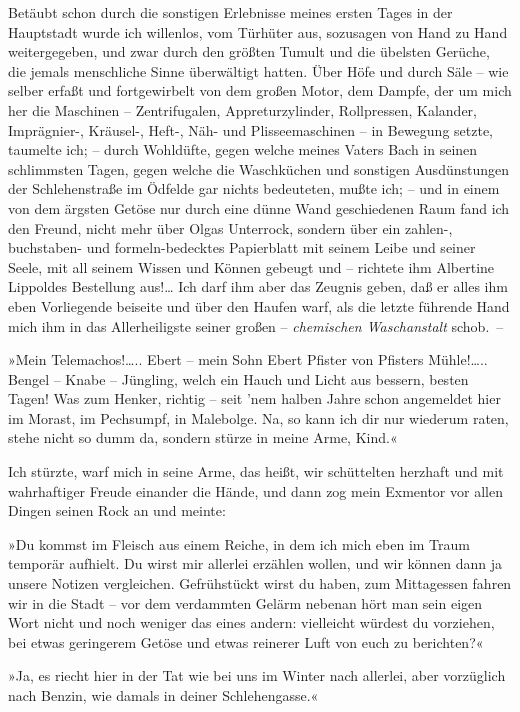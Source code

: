 Betäubt schon durch die sonstigen Erlebnisse meines ersten Tages in
der Hauptstadt wurde ich willenlos, vom Türhüter aus, sozusagen von
Hand zu Hand weitergegeben, und zwar durch den größten Tumult und
die übelsten Gerüche, die jemals menschliche Sinne überwältigt
hatten. Über Höfe und durch Säle – wie selber erfaßt und
fortgewirbelt von dem großen Motor, dem Dampfe, der um mich her die
Maschinen – Zentrifugalen, Appreturzylinder, Rollpressen, Kalander,
Imprägnier-, Kräusel-, Heft-, Näh- und Plisseemaschinen – in
Bewegung setzte, taumelte ich; – durch Wohldüfte, gegen welche
meines Vaters Bach in seinen schlimmsten Tagen, gegen welche die
Waschküchen und sonstigen Ausdünstungen der Schlehenstraße im
Ödfelde gar nichts bedeuteten, mußte ich; – und in einem von dem
ärgsten Getöse nur durch eine dünne Wand geschiedenen Raum fand ich
den Freund, nicht mehr über Olgas Unterrock, sondern über ein
zahlen-, buchstaben- und formeln-bedecktes Papierblatt mit seinem
Leibe und seiner Seele, mit all seinem Wissen und Können gebeugt
und – richtete ihm Albertine Lippoldes Bestellung aus!\ldots{} Ich darf
ihm aber das Zeugnis geben, daß er alles ihm eben Vorliegende
beiseite und über den Haufen warf, als die letzte führende Hand
mich ihm in das Allerheiligste seiner großen –
\emph{chemischen Waschanstalt} schob.~–

»Mein Telemachos!\ldots{}.. Ebert – mein Sohn Ebert Pfister von Pfisters
Mühle!\ldots{}.. Bengel – Knabe – Jüngling, welch ein Hauch und Licht
aus bessern, besten Tagen! Was zum Henker, richtig – seit 'nem
halben Jahre schon angemeldet hier im Morast, im Pechsumpf, in
Malebolge. Na, so kann ich dir nur wiederum raten, stehe nicht so
dumm da, sondern stürze in meine Arme, Kind.«

Ich stürzte, warf mich in seine Arme, das heißt, wir schüttelten
herzhaft und mit wahrhaftiger Freude einander die Hände, und dann
zog mein Exmentor vor allen Dingen seinen Rock an und meinte:

»Du kommst im Fleisch aus einem Reiche, in dem ich mich eben im
Traum temporär aufhielt. Du wirst mir allerlei erzählen wollen, und
wir können dann ja unsere Notizen vergleichen. Gefrühstückt wirst
du haben, zum Mittagessen fahren wir in die Stadt – vor dem
verdammten Gelärm nebenan hört man sein eigen Wort nicht und noch
weniger das eines andern: vielleicht würdest du vorziehen, bei
etwas geringerem Getöse und etwas reinerer Luft von euch zu
berichten?«

»Ja, es riecht hier in der Tat wie bei uns im Winter nach allerlei,
aber vorzüglich nach Benzin, wie damals in deiner Schlehengasse.«

